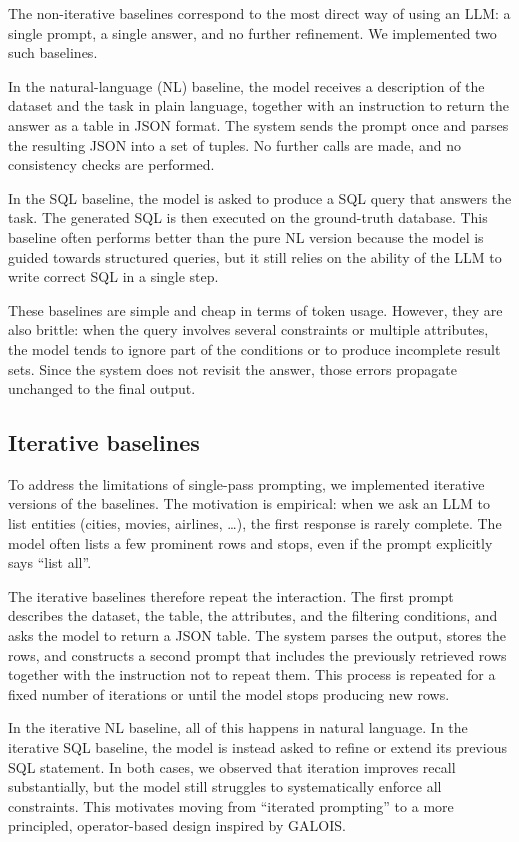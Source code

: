 \documentclass[11pt]{article}
\begin{document}
The non-iterative baselines correspond to the most direct way of using an LLM: a single
prompt, a single answer, and no further refinement. We implemented two such baselines.

In the natural-language (NL) baseline, the model receives a description of the
dataset and the task in plain language, together with an instruction to return the answer
as a table in JSON format. The system sends the prompt once and parses the resulting
JSON into a set of tuples. No further calls are made, and no consistency checks are
performed.

In the SQL baseline, the model is asked to produce a SQL query that answers the
task. The generated SQL is then executed on the ground-truth database. This baseline
often performs better than the pure NL version because the model is guided towards
structured queries, but it still relies on the ability of the LLM to write correct SQL in a
single step.

These baselines are simple and cheap in terms of token usage. However, they are
also brittle: when the query involves several constraints or multiple attributes, the model
tends to ignore part of the conditions or to produce incomplete result sets. Since the
system does not revisit the answer, those errors propagate unchanged to the final output.

\subsection{Iterative baselines}

To address the limitations of single-pass prompting, we implemented iterative versions of
the baselines. The motivation is empirical: when we ask an LLM to list entities (cities,
movies, airlines, \dots), the first response is rarely complete. The model often lists a few
prominent rows and stops, even if the prompt explicitly says ``list all''.

The iterative baselines therefore repeat the interaction. The first prompt describes
the dataset, the table, the attributes, and the filtering conditions, and asks the model
to return a JSON table. The system parses the output, stores the rows, and constructs
a second prompt that includes the previously retrieved rows together with the instruction
not to repeat them. This process is repeated for a fixed number of iterations or until the
model stops producing new rows.

In the iterative NL baseline, all of this happens in natural language. In the iterative
SQL baseline, the model is instead asked to refine or extend its previous SQL statement.
In both cases, we observed that iteration improves recall substantially, but the model
still struggles to systematically enforce all constraints. This motivates moving from
``iterated prompting'' to a more principled, operator-based design inspired by GALOIS.
\end{document}
